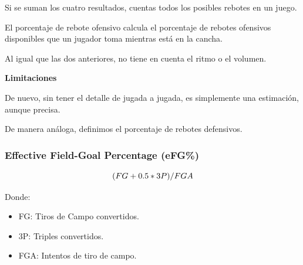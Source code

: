 \documentclass[
]{article}
\newenvironment{Shaded}{\begin{snugshade}}{\end{snugshade}}
\newcommand{\DecValTok}[1]{\textcolor[rgb]{0.00,0.00,0.81}{#1}}
\newcommand{\NormalTok}[1]{#1}
\newcommand{\OperatorTok}[1]{\textcolor[rgb]{0.81,0.36,0.00}{\textbf{#1}}}
\newcommand{\StringTok}[1]{\textcolor[rgb]{0.31,0.60,0.02}{#1}}
\providecommand{\tightlist}{%
  \setlength{\itemsep}{0pt}\setlength{\parskip}{0pt}}
\begin{document}
Si se suman los cuatro resultados, cuentas todos los posibles rebotes en
un juego.

El porcentaje de rebote ofensivo calcula el porcentaje de rebotes
ofensivos disponibles que un jugador toma mientras está en la cancha.

Al igual que las dos anteriores, no tiene en cuenta el ritmo o el
volumen.

\textbf{Limitaciones}

De nuevo, sin tener el detalle de jugada a jugada, es simplemente una
estimación, aunque precisa.

De manera análoga, definimos el porcentaje de rebotes defensivos.

\begin{Shaded}
\end{Shaded}

\hypertarget{effective-field-goal-percentage-efg}{%
\subsubsection{Effective Field-Goal Percentage
(eFG\%)}\label{effective-field-goal-percentage-efg}}

\[
  \makebox[\linewidth]{$(FG+0.5*3P)/FGA$}
\]

Donde:

\begin{itemize}
\tightlist
\item
  FG: Tiros de Campo convertidos.
\item
  3P: Triples convertidos.
\item
  FGA: Intentos de tiro de campo.
\end{itemize}
\end{document}
